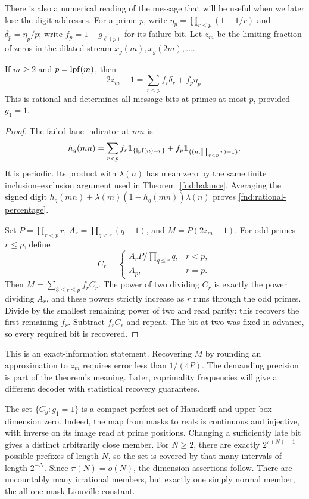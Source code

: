 There is also a numerical reading of the message that will be useful
when we later lose the digit addresses.  For a prime $p$, write
$\eta_p=\prod_{r<p}(1-1/r)$ and $\delta_p=\eta_p/p$;
write $f_p=1-g_{\ell(p)}$ for its failure bit.  Let $z_m$ be the
limiting fraction of zeros in the dilated stream $x_g(m),x_g(2m),\ldots$.

\begin{proposition}\label{fnd:percentage}
If $m\ge2$ and $p=\operatorname{lpf}(m)$, then
\begin{equation}
 2z_m-1=\sum_{r<p}f_r\delta_r+f_p\eta_p.
 \label{fnd:rational-percentage}
\end{equation}
This is rational and determines all message bits at primes at most
$p$, provided $g_1=1$.
\end{proposition}
\begin{proof}
The failed-lane indicator at $mn$ is
\[
 h_g(mn)=\sum_{r<p}f_r\mathbf1_{\{\operatorname{lpf}(n)=r\}}
       +f_p\mathbf1_{\{(n,\prod_{r<p}r)=1\}}.
\]
It is periodic.  Its product with $\lambda(n)$ has mean zero by
the same finite inclusion--exclusion argument used in
Theorem~\ref{fnd:balance}.  Averaging the signed digit
$h_g(mn)+\lambda(m)(1-h_g(mn))\lambda(n)$ proves
\eqref{fnd:rational-percentage}.

Set $P=\prod_{r<p}r$, $A_r=\prod_{q<r}(q-1)$, and
$M=P(2z_m-1)$.  For odd primes $r\le p$, define
\[
 C_r=\begin{cases}
 A_rP/\prod_{q\le r}q,&r<p,\\
 A_p,&r=p.
 \end{cases}
\]
Then $M=\sum_{3\le r\le p}f_rC_r$.  The power of two dividing
$C_r$ is exactly the power dividing $A_r$, and these powers strictly
increase as $r$ runs through the odd primes.  Divide by the smallest
remaining power of two and read parity: this recovers the first
remaining $f_r$.  Subtract $f_rC_r$ and repeat.  The bit at two was
fixed in advance, so every required bit is recovered.
\end{proof}

This is an exact-information statement.  Recovering $M$ by rounding
an approximation to $z_m$ requires error less than $1/(4P)$.
The demanding precision is part of the theorem's meaning.  Later,
coprimality frequencies will give a different decoder with statistical
recovery guarantees.

\begin{remark}\label{fnd:cantor}
The set $\{C_g:g_1=1\}$ is a compact perfect set of Hausdorff and
upper box dimension zero.  Indeed, the map from masks to reals is
continuous and injective, with inverse on its image read at prime
positions.  Changing a sufficiently late bit gives a distinct
arbitrarily close member.  For $N\ge2$, there are exactly
$2^{\pi(N)-1}$ possible prefixes of length $N$, so the set is
covered by that many intervals of length $2^{-N}$.  Since
$\pi(N)=o(N)$, the dimension assertions follow.  There are
uncountably many irrational members, but exactly one simply normal
member, the all-one-mask Liouville constant.
\end{remark}


